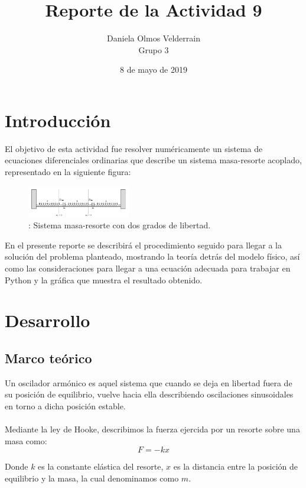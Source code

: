 \documentclass[letterpaper,12pt]{article}
\begin{document}
\title{Reporte de la Actividad 9}
\author{Daniela Olmos Velderrain\\Grupo 3}
\date{8 de mayo de 2019}

\maketitle

\section{Introducción}
El objetivo de esta actividad fue resolver numéricamente un sistema de ecuaciones diferenciales ordinarias que describe un sistema masa-resorte acoplado, representado en la siguiente figura:

\begin{figure}[H]
\centering
\includegraphics[width=0.4\textwidth]{esquema1.png}
\caption{\label{fig:graf1}: Sistema masa-resorte con dos grados de libertad. }
\end{figure}

En el presente reporte se describirá el procedimiento seguido para llegar a la solución del problema planteado, mostrando la teoría detrás del modelo físico, así como las consideraciones para llegar a una ecuación adecuada para trabajar en Python y la gráfica que muestra el resultado obtenido.



\section{Desarrollo}

\subsection{Marco teórico}
Un oscilador armónico es aquel sistema que cuando se deja en libertad fuera de su posición de equilibrio, vuelve hacia ella describiendo oscilaciones sinusoidales en torno a dicha posición estable. \\\\
Mediante la ley de Hooke, describimos la fuerza ejercida por un resorte sobre una masa como:
\[F=-kx\]

Donde $k$ es la constante elástica del resorte, $x$ es la distancia entre la posición de equilibrio y la masa, la cual denominamos como $m$.\\\\
\end{document}
